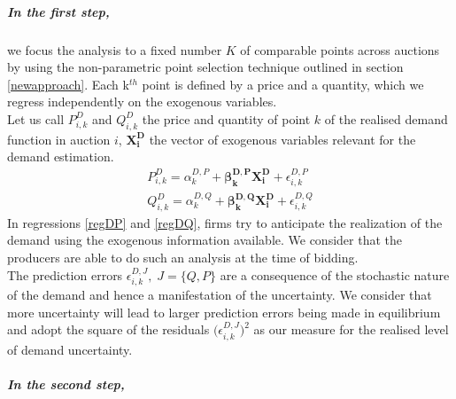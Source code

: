 
\subparagraph{In the first step,} 
\label{firststepresiduals}
we focus the analysis to a fixed number $K$ of comparable points across auctions by using the non-parametric point selection technique outlined in section \ref{newapproach}. 
Each k$^{th}$ point is defined by a price and a quantity, which we regress independently on the exogenous variables. \\%

Let us call $P_{i,k}^D$ and $Q_{i,k}^D$ the price and quantity of point $k$ of the realised demand function in auction $i$, $\boldsymbol{X^D_i}$ the vector of exogenous variables relevant for the demand estimation.
\begin{eqnarray}
P_{i,k}^D=\alpha_{k}^{D,P}+{\boldsymbol{\beta_{k}^{D,P}}} \boldsymbol{X^D_i}+\epsilon_{i,k}^{D,P} \label{regDP}\\
Q_{i,k}^D=\alpha_{k}^{D,Q}+{\boldsymbol{\beta_{k}^{D,Q}}} \boldsymbol{X^D_i}+\epsilon_{i,k}^{D,Q} \label{regDQ}
\end{eqnarray}
In regressions \ref{regDP} and \ref{regDQ}, firms try to anticipate the realization of the demand using the exogenous information available. We consider that the producers are able to do such an analysis at the time of bidding. \\%

The prediction errors  $\epsilon_{i,k}^{D,J}, \; J=\{Q, P\}$ are a consequence of the stochastic nature of the demand and hence a manifestation of the uncertainty. We consider that more uncertainty will lead to larger prediction errors being made in equilibrium and adopt the 
square
of the residuals $ \bigl( \epsilon_{i,k}^{D,J} \bigr)^2$ as our measure for the realised level of demand uncertainty.



\subparagraph{In the second step,} 
\label{secondstepresiduals}

